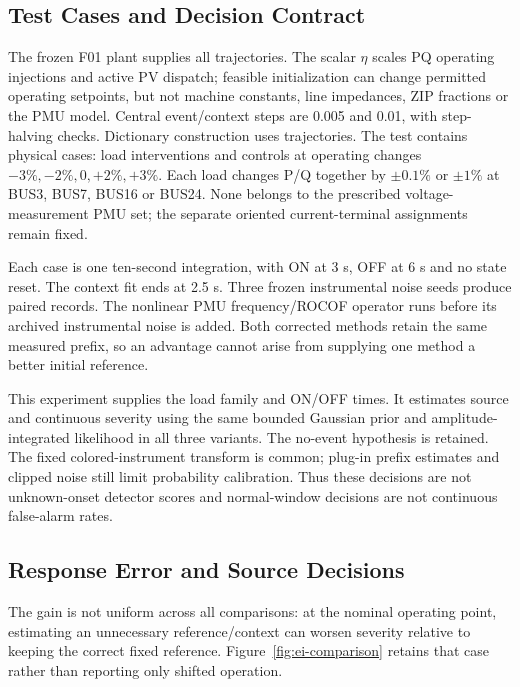 \subsection{Test Cases and Decision Contract}
The frozen F01 plant supplies all trajectories. The scalar $\eta$ scales
PQ operating injections and active PV dispatch; feasible initialization
can change permitted operating setpoints, but not machine constants,
line impedances, ZIP fractions or the PMU model. Central event/context
steps are 0.005 and 0.01, with step-halving checks. Dictionary construction
uses \EIDictionaryCases{} trajectories. The test contains \EITestPhysical{}
physical cases: \EIEventPhysical{} load interventions and \EINormalPhysical{}
controls at operating changes $-3\%,-2\%,0,+2\%,+3\%$. Each load changes
P/Q together by $\pm0.1\%$ or $\pm1\%$ at BUS3, BUS7, BUS16 or BUS24.
None belongs to the prescribed voltage-measurement PMU set; the separate
oriented current-terminal assignments remain fixed.

Each case is one ten-second integration, with ON at 3 s, OFF at 6 s and
no state reset. The context fit ends at 2.5 s. Three frozen instrumental
noise seeds produce \EIObserved{} paired records. The nonlinear PMU
frequency/ROCOF operator runs before its archived instrumental noise is
added. Both corrected methods retain the same measured prefix, so an
advantage cannot arise from supplying one method a better initial reference.

This experiment supplies the load family and ON/OFF times. It estimates
source and continuous severity using the same bounded Gaussian prior and
amplitude-integrated likelihood in all three variants. The no-event
hypothesis is retained. The fixed colored-instrument transform is common;
plug-in prefix estimates and clipped noise still limit probability
calibration. Thus these decisions are not unknown-onset detector scores
and normal-window decisions are not continuous false-alarm rates.

\subsection{Response Error and Source Decisions}



The gain is not uniform across all comparisons: at the nominal operating
point, estimating an unnecessary reference/context can worsen severity
relative to keeping the correct fixed reference. Figure~\ref{fig:ei-comparison}
retains that case rather than reporting only shifted operation.

